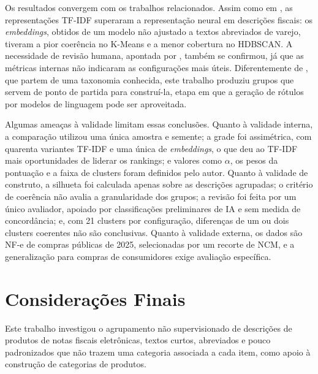 \documentclass[english,brazilian]{UNISINOSmonografia}
\begin{document}
Os resultados convergem com os trabalhos relacionados. Assim como em , as representações TF-IDF superaram a representação neural em descrições fiscais: os \textit{embeddings}, obtidos de um modelo não ajustado a textos abreviados de varejo, tiveram a pior coerência no K-Means e a menor cobertura no HDBSCAN. A necessidade de revisão humana, apontada por , também se confirmou, já que as métricas internas não indicaram as configurações mais úteis. Diferentemente de , que partem de uma taxonomia conhecida, este trabalho produziu grupos que servem de ponto de partida para construí-la, etapa em que a geração de rótulos por modelos de linguagem \cite{murray2025using} pode ser aproveitada.

Algumas ameaças à validade limitam essas conclusões. Quanto à validade interna, a comparação utilizou uma única amostra e semente; a grade foi assimétrica, com quarenta variantes TF-IDF e uma única de \textit{embeddings}, o que deu ao TF-IDF mais oportunidades de liderar os rankings; e valores como $\alpha$, os pesos da pontuação e a faixa de clusters foram definidos pelo autor. Quanto à validade de construto, a silhueta foi calculada apenas sobre as descrições agrupadas; o critério de coerência não avalia a granularidade dos grupos; a revisão foi feita por um único avaliador, apoiado por classificações preliminares de IA e sem medida de concordância; e, com 21 clusters por configuração, diferenças de um ou dois clusters coerentes não são conclusivas. Quanto à validade externa, os dados são NF-e de compras públicas de 2025, selecionadas por um recorte de NCM, e a generalização para compras de consumidores exige avaliação específica.




\chapter{Considerações Finais}
\label{cap:consideracoes}

Este trabalho investigou o agrupamento não supervisionado de descrições de produtos de notas fiscais eletrônicas, textos curtos, abreviados e pouco padronizados que não trazem uma categoria associada a cada item, como apoio à construção de categorias de produtos.
\end{document}
